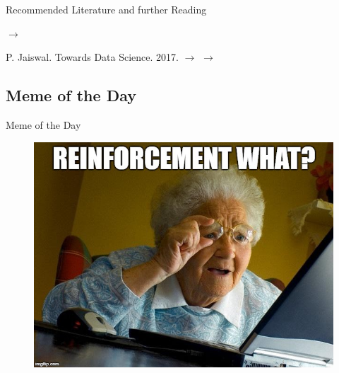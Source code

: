 \begin{frame}[allowframebreaks]{Recommended Literature and further Reading}{}
\begin{thebibliography}{2}
			{$\rightarrow$
				\href{https://gym.openai.com/}{}
			}
			
			{P. Jaiswal. Towards Data Science. 2017.}
			{$\rightarrow$
				\href{https://towardsdatascience.com/getting-started-with-reinforcement-q-learning-77499b1766b6}
				{}
			}
			{$\rightarrow$ \href{
				http://incompleteideas.net/book/bookdraft2017nov5.pdf
			}{}}
	\end{thebibliography}
\end{frame}


\subsection{Meme of the Day}

\begin{frame}{Meme of the Day}{}
	\begin{figure}
		\includegraphics[scale=0.30]{14_rl/02_img/meme_of_the_day}
	\end{figure}
\end{frame}


\makethanks

